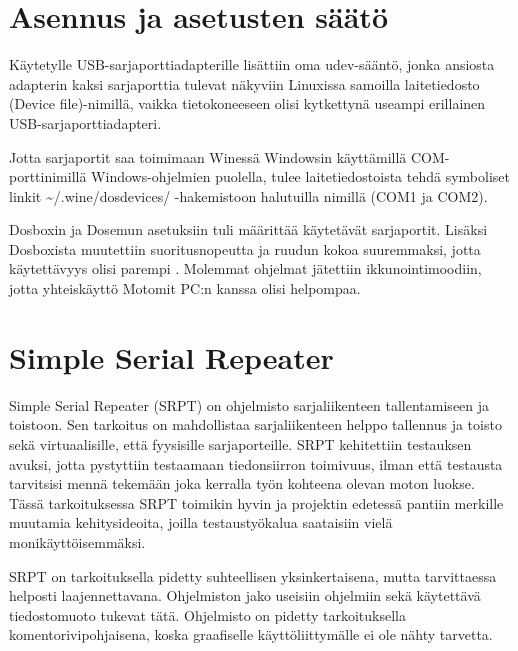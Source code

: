 \section{Asennus ja asetusten säätö}
Käytetylle USB-sarjaporttiadapterille lisättiin oma udev-sääntö, jonka ansiosta adapterin kaksi sarjaporttia tulevat näkyviin Linuxissa samoilla laitetiedosto (Device file)-nimillä, vaikka tietokoneeseen olisi kytkettynä useampi erillainen USB-sarjaporttiadapteri.

Jotta sarjaportit saa toimimaan Winessä Windowsin käyttämillä COM-porttinimillä Windows-ohjelmien puolella, tulee laitetiedostoista tehdä symboliset linkit \textasciitilde{}/.wine/dosdevices/ -hakemistoon halutuilla nimillä (COM1 ja COM2).\cite[s. 21]{wine:manual}

Dosboxin ja Dosemun asetuksiin tuli määrittää käytetävät sarjaportit. Lisäksi Dosboxista muutettiin suoritusnopeutta ja ruudun kokoa suuremmaksi, jotta käytettävyys olisi parempi \cite{dosbox:conf}. Molemmat ohjelmat jätettiin ikkunointimoodiin, jotta yhteiskäyttö Motomit PC:n kanssa olisi helpompaa.


\section{Simple Serial Repeater}

Simple Serial Repeater (SRPT) on ohjelmisto sarjaliikenteen tallentamiseen ja toistoon. Sen tarkoitus on mahdollistaa sarjaliikenteen helppo tallennus ja toisto sekä virtuaalisille, että fyysisille sarjaporteille. SRPT kehitettiin testauksen avuksi, jotta pystyttiin testaamaan tiedonsiirron toimivuus, ilman että testausta tarvitsisi mennä tekemään joka kerralla työn kohteena olevan moton luokse. Tässä tarkoituksessa SRPT toimikin hyvin ja projektin edetessä pantiin merkille muutamia kehitysideoita, joilla testaustyökalua saataisiin vielä monikäyttöisemmäksi.

SRPT on tarkoituksella pidetty suhteellisen yksinkertaisena, mutta tarvittaessa helposti laajennettavana. Ohjelmiston jako useisiin ohjelmiin sekä käytettävä tiedostomuoto tukevat tätä. Ohjelmisto on pidetty tarkoituksella komentorivipohjaisena, koska graafiselle käyttöliittymälle ei ole nähty tarvetta.

